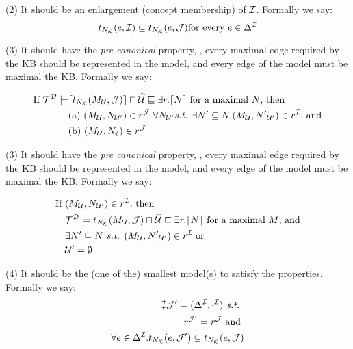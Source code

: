 \documentclass[draft]{article}
\begin{document}
(2) It should be an enlargement (\wrt concept membership) of $\mathcal{I}$. Formally we say:
\begin{equation*}
  t_{N_{\mathcal{K}}}({e}, {\mathcal{I}}) \subseteq t_{N_{\mathcal{K}}}({e}, {\mathcal{J}}) \text{for every } e \in \Delta^{\mathcal{I}}
\end{equation*}

(3) It should have the \emph{pre canonical} property, \ie, {\color{red}every maximal edge required by the KB should be represented in the model}, and every edge of the model must be maximal \wrt the KB. Formally we say:

  \begin{align*}
    \text{If } \mathcal{T}^{\mathcal{D}} \models & \lceil{\ensuremath{t_{N_{\mathcal{K}}}({{M}_{\mathcal{U}}}, {\mathcal{J}})}}\rceil \sqcap \widehat{{\mathcal{U}}}  \sqsubseteq \exists r.\lceil{N}\rceil \text{ for a maximal } N \text{, then } \\ 
    & \text{(a) } ({M}_{\mathcal{U}}, {N}_{\mathcal{U}'} ) \in r^{\mathcal{J}} \text{ } \forall {N}_{\mathcal{U}'} \textit{s.t. } \exists N'\subseteq N. ({M}_{\mathcal{U}}, {N'}_{\mathcal{U}'}) \in r^{\mathcal{I}} \text{, and}\\ 
    & \text{(b) }({M}_{\mathcal{U}}, {N}_{\emptyset}) \in r^{\mathcal{J}}
  \end{align*}

  (3) It should have the \emph{pre canonical} property, \ie, every maximal edge required by the KB should be represented in the model, and {\color{red} every edge of the model must be maximal \wrt the KB}. Formally we say:

  \begin{align*}
    \text{If }&({M}_{\mathcal{U}}, {N}_{\mathcal{U}'}) \in r^{\mathcal{I}}  \text{, then} \\
    & \mathcal{T}^{\mathcal{D}} \models t_{N_{\mathcal{K}}}({{M}_{\mathcal{U}}}, {\mathcal{J}}) \sqcap \widehat{{\mathcal{U}}} \sqsubseteq \exists r.\lceil{N}\rceil \text{ for a maximal } M \text{, and} \\
    & \exists N' \sqsubseteq N \textit{ s.t. } ({M}_{\mathcal{U}}, {N'}_{\mathcal{U}'}) \in r^{\mathcal{I}} \text{ or } \\
    & \mathcal{U}' = \emptyset 
  \end{align*}

  (4) It should be the (one of the) smallest model(s) to satisfy the properties. Formally we say: 
  \begin{align*}
    \nexists \mathcal{J}' = (\Delta^{\mathcal{I}}, \cdot^{\mathcal{I}}) \textit{ s.t. } \\
    r^{\mathcal{J}'} = r^{\mathcal{J}} \text{ and } \\ 
    \forall e \in \Delta^{\mathcal{I}}.t_{N_{\mathcal{K}}}({e}, {\mathcal{J}'}) \subseteq t_{N_{\mathcal{K}}}({e}, {\mathcal{J}})
  \end{align*}
\end{document}
